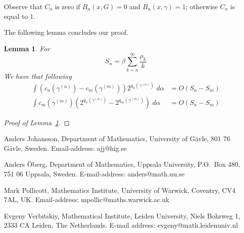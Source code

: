 \documentclass[11pt, a4paper, oneside]{scrartcl}
\newtheorem{lemma}[thm]{Lemma}
\theoremstyle{definition}
\theoremstyle{remark}
\providecommand{\Ordo}[1]{{O(#1)}}
\begin{document}
 Observe that $C_n$ is zero if $B_n(x,G)=0$ and $B_n(x,\gamma)=1$; otherwise $C_n$ is equal to $1$.

 The following lemma concludes our proof.
 \begin{lemma}\label{bounds}
   For
   \[ S_n = \beta \sum_{k=n}^\infty \frac{\rho_k}{k} \]
   We have that following
   \begin{align}
     \label{cnbound}
     \int \left(c_n(\gamma^{(n)})-c_m(\gamma^{(m)}) \right)2^{q_n(\gamma^{(n)})}\; d\alpha
     &= \Ordo{S_n - S_m}\\
     \label{qnbound}
     \int c_m(\gamma^{(m)})\left(2^{q_n(\gamma^{(n)})}-2^{q_m(\gamma^{(m)})} \right) \; d\alpha
     &= \Ordo{S_n-S_m}
   \end{align}
 \end{lemma}

 \begin{proof}[Proof of Lemma~\ref{bounds}]


 \end{proof}


\printbibliography

\noindent
Anders Johansson, Department of Mathematics, University of G\"avle,
801 76 G\"avle, Sweden. Email-address: ajj@hig.se\newline

\noindent
Anders \"Oberg, Department of Mathematics, Uppsala University, P.O.\
Box 480, 751 06 Uppsala, Sweden. E-mail-address:
anders@math.uu.se\newline

\noindent
Mark Pollicott, Mathematics Institute, University of Warwick,
Coventry, CV4 7AL, UK. Email-address: mpollic@maths.warwick.ac.uk\newline

\noindent
Evgeny Verbitskiy, Mathematical Institute, Leiden University,
Niels Bohrweg 1, 2333 CA Leiden, The Netherlands. E-mail address: evgeny@math.leidenuniv.nl
\end{document}
